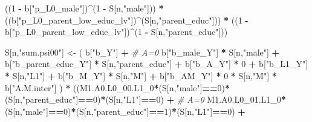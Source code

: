 \documentclass[
]{book}
\newenvironment{Shaded}{\begin{snugshade}}{\end{snugshade}}
\newcommand{\CommentTok}[1]{\textcolor[rgb]{0.56,0.35,0.01}{\textit{#1}}}
\newcommand{\DecValTok}[1]{\textcolor[rgb]{0.00,0.00,0.81}{#1}}
\newcommand{\NormalTok}[1]{#1}
\newcommand{\OtherTok}[1]{\textcolor[rgb]{0.56,0.35,0.01}{#1}}
\newcommand{\SpecialCharTok}[1]{\textcolor[rgb]{0.81,0.36,0.00}{\textbf{#1}}}
\newcommand{\StringTok}[1]{\textcolor[rgb]{0.31,0.60,0.02}{#1}}
\begin{document}
\begin{Shaded}
\begin{Highlighting}[]
\NormalTok{      ((}\DecValTok{1} \SpecialCharTok{{-}}\NormalTok{ b[}\StringTok{"p\_L0\_male"}\NormalTok{])}\SpecialCharTok{\^{}}\NormalTok{(}\DecValTok{1} \SpecialCharTok{{-}}\NormalTok{ S[n,}\StringTok{"male"}\NormalTok{])) }\SpecialCharTok{*} 
\NormalTok{      ((b[}\StringTok{"p\_L0\_parent\_low\_educ\_lv"}\NormalTok{])}\SpecialCharTok{\^{}}\NormalTok{(S[n,}\StringTok{"parent\_educ"}\NormalTok{])) }\SpecialCharTok{*}
\NormalTok{      ((}\DecValTok{1} \SpecialCharTok{{-}}\NormalTok{ b[}\StringTok{"p\_L0\_parent\_low\_educ\_lv"}\NormalTok{])}\SpecialCharTok{\^{}}\NormalTok{(}\DecValTok{1} \SpecialCharTok{{-}}\NormalTok{ S[n,}\StringTok{"parent\_educ"}\NormalTok{])) }
    
\NormalTok{    S[n,}\StringTok{"sum.psi00"}\NormalTok{] }\OtherTok{\textless{}{-}}\NormalTok{  ( b[}\StringTok{"b\_Y"}\NormalTok{] }\SpecialCharTok{+}                                            \CommentTok{\# A=0}
\NormalTok{                             b[}\StringTok{"b\_male\_Y"}\NormalTok{] }\SpecialCharTok{*}\NormalTok{ S[n,}\StringTok{"male"}\NormalTok{] }\SpecialCharTok{+} 
\NormalTok{                             b[}\StringTok{"b\_parent\_educ\_Y"}\NormalTok{] }\SpecialCharTok{*}\NormalTok{ S[n,}\StringTok{"parent\_educ"}\NormalTok{] }\SpecialCharTok{+} 
\NormalTok{                             b[}\StringTok{"b\_A\_Y"}\NormalTok{] }\SpecialCharTok{*} \DecValTok{0} \SpecialCharTok{+} 
\NormalTok{                             b[}\StringTok{"b\_L1\_Y"}\NormalTok{] }\SpecialCharTok{*}\NormalTok{ S[n,}\StringTok{"L1"}\NormalTok{] }\SpecialCharTok{+}
\NormalTok{                             b[}\StringTok{"b\_M\_Y"}\NormalTok{] }\SpecialCharTok{*}\NormalTok{ S[n,}\StringTok{"M"}\NormalTok{] }\SpecialCharTok{+}
\NormalTok{                             b[}\StringTok{"b\_AM\_Y"}\NormalTok{] }\SpecialCharTok{*} \DecValTok{0} \SpecialCharTok{*}\NormalTok{ S[n,}\StringTok{"M"}\NormalTok{] }\SpecialCharTok{*}\NormalTok{ b[}\StringTok{"A.M.inter"}\NormalTok{] ) }\SpecialCharTok{*}
\NormalTok{      ((M1.A0.L0\_00.L1\_0}\SpecialCharTok{*}\NormalTok{(S[n,}\StringTok{"male"}\NormalTok{]}\SpecialCharTok{==}\DecValTok{0}\NormalTok{)}\SpecialCharTok{*}\NormalTok{(S[n,}\StringTok{"parent\_educ"}\NormalTok{]}\SpecialCharTok{==}\DecValTok{0}\NormalTok{)}\SpecialCharTok{*}\NormalTok{(S[n,}\StringTok{"L1"}\NormalTok{]}\SpecialCharTok{==}\DecValTok{0}\NormalTok{) }\SpecialCharTok{+} \CommentTok{\# A\textquotesingle{}=0}
\NormalTok{          M1.A0.L0\_01.L1\_0}\SpecialCharTok{*}\NormalTok{(S[n,}\StringTok{"male"}\NormalTok{]}\SpecialCharTok{==}\DecValTok{0}\NormalTok{)}\SpecialCharTok{*}\NormalTok{(S[n,}\StringTok{"parent\_educ"}\NormalTok{]}\SpecialCharTok{==}\DecValTok{1}\NormalTok{)}\SpecialCharTok{*}\NormalTok{(S[n,}\StringTok{"L1"}\NormalTok{]}\SpecialCharTok{==}\DecValTok{0}\NormalTok{) }\SpecialCharTok{+}

\end{Highlighting}
\end{Shaded}
\end{document}
